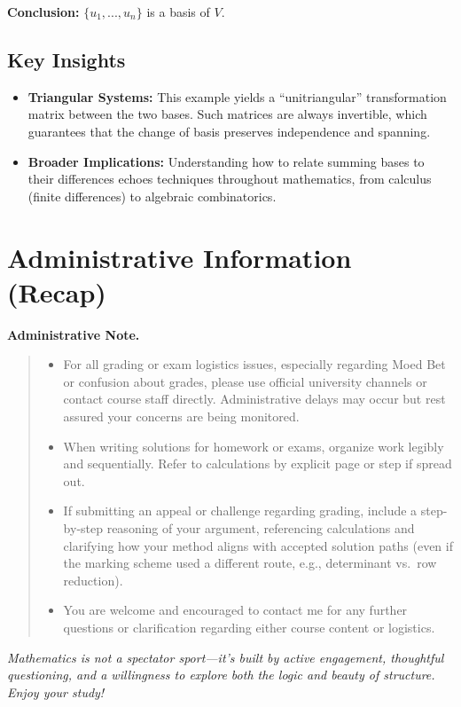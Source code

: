 \documentclass[12pt]{article}
\newenvironment{announcement}
  {\medskip\noindent\textbf{Administrative Note.}\begin{quote}\small}
  {\end{quote}\medskip}
\begin{document}
\textbf{Conclusion:} $\{u_1, ..., u_n\}$ is a basis of $V$.

\subsection{Key Insights}

\begin{itemize}
    \item \textbf{Triangular Systems:} This example yields a ``unitriangular'' transformation matrix between the two bases. Such matrices are always invertible, which guarantees that the change of basis preserves independence and spanning.
    \item \textbf{Broader Implications:} Understanding how to relate summing bases to their differences echoes techniques throughout mathematics, from calculus (finite differences) to algebraic combinatorics.
\end{itemize}

\section*{Administrative Information (Recap)}
\begin{announcement}
\begin{itemize}
    \item For all grading or exam logistics issues, especially regarding Moed Bet or confusion about grades, please use official university channels or contact course staff directly. Administrative delays may occur but rest assured your concerns are being monitored.
    \item When writing solutions for homework or exams, organize work legibly and sequentially. Refer to calculations by explicit page or step if spread out.
    \item If submitting an appeal or challenge regarding grading, include a step-by-step reasoning of your argument, referencing calculations and clarifying how your method aligns with accepted solution paths (even if the marking scheme used a different route, e.g., determinant vs.\ row reduction).
    \item You are welcome and encouraged to contact me for any further questions or clarification regarding either course content or logistics.
\end{itemize}
\end{announcement}

\vspace{2em}
\begin{center}
    {\itshape Mathematics is not a spectator sport---it’s built by active engagement, thoughtful questioning, and a willingness to explore both the logic and beauty of structure. \\[0.5em]
    Enjoy your study!}
\end{center}
\end{document}
